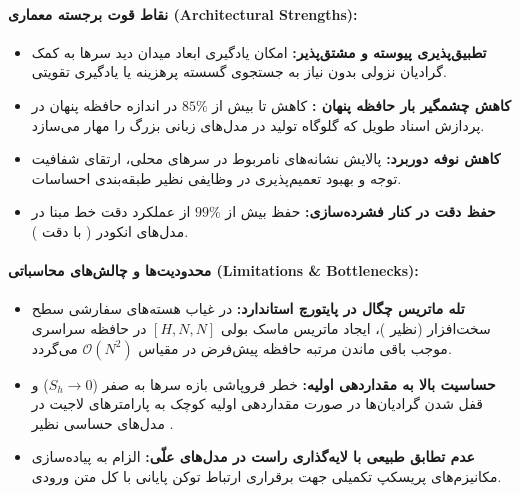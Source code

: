 \paragraph{نقاط قوت برجسته معماری (Architectural Strengths):}
\begin{itemize}
    \item \textbf{تطبیق‌پذیری پیوسته و مشتق‌پذیر:} امکان یادگیری ابعاد میدان دید سرها به کمک گرادیان نزولی بدون نیاز به جستجوی گسسته پرهزینه یا یادگیری تقویتی.
    \item \textbf{کاهش چشمگیر بار حافظه پنهان :} کاهش تا بیش از $85\%$ در اندازه حافظه پنهان در پردازش اسناد طویل که گلوگاه تولید در مدل‌های زبانی بزرگ را مهار می‌سازد.
    \item \textbf{کاهش نوفه دوربرد:} پالایش نشانه‌های نامربوط در سرهای محلی، ارتقای شفافیت توجه و بهبود تعمیم‌پذیری در وظایفی نظیر طبقه‌بندی احساسات.
    \item \textbf{حفظ دقت در کنار فشرده‌سازی:} حفظ بیش از $99\%$ از عملکرد دقت خط مبنا در مدل‌های انکودر ( با دقت ).
\end{itemize}

\paragraph{محدودیت‌ها و چالش‌های محاسباتی (Limitations \& Bottlenecks):}
\begin{itemize}
    \item \textbf{تله ماتریس چگال در پایتورچ استاندارد:} در غیاب هسته‌های سفارشی سطح سخت‌افزار (نظیر )، ایجاد ماتریس ماسک بولی $[H, N, N]$ در حافظه سراسری  موجب باقی ماندن مرتبه حافظه پیش‌فرض در مقیاس $\mathcal{O}(N^2)$ می‌گردد.
    \item \textbf{حساسیت بالا به مقداردهی اولیه:} خطر فروپاشی بازه سرها به صفر ($S_h \to 0$) و قفل شدن گرادیان‌ها در صورت مقداردهی اولیه کوچک به پارامترهای لاجیت در مدل‌های حساسی نظیر .
    \item \textbf{عدم تطابق طبیعی با لایه‌گذاری راست در مدل‌های علّی:} الزام به پیاده‌سازی مکانیزم‌های پریسکپ تکمیلی جهت برقراری ارتباط توکن پایانی با کل متن ورودی.
\end{itemize}

